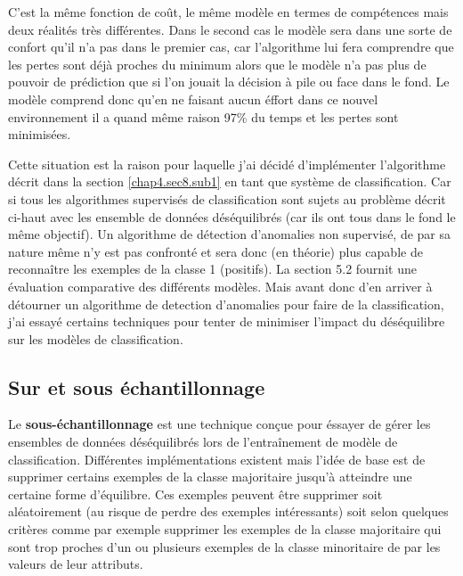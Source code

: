 C'est la même fonction de coût, le même modèle en termes de compétences mais deux réalités très différentes. Dans le second cas le modèle sera dans une sorte de confort qu'il n'a pas dans le premier cas, car l'algorithme lui fera comprendre que les pertes sont déjà proches du minimum alors que le modèle n'a pas plus de pouvoir de prédiction que si l'on jouait la décision à pile ou face dans le fond. Le modèle comprend donc qu'en ne faisant aucun éffort dans ce nouvel environnement il a quand même raison 97\% du temps et les pertes sont minimisées.

Cette situation est la raison pour laquelle j'ai décidé d'implémenter l'algorithme décrit dans la section \ref{chap4.sec8.sub1} en tant que système de classification. Car si tous les algorithmes supervisés de classification sont sujets au problème décrit ci-haut avec les ensemble de données déséquilibrés (car ils ont tous dans le fond le même objectif). Un algorithme de détection d'anomalies non supervisé, de par sa nature même n'y est pas confronté et sera donc (en théorie) plus capable de reconnaître les exemples de la classe 1 (positifs). La section 5.2 fournit une évaluation comparative des différents modèles. Mais avant donc d'en arriver à détourner un algorithme de detection d'anomalies pour faire de la classification, j'ai essayé certains techniques pour tenter de minimiser l'impact du déséquilibre sur les modèles de classification.

\subsection{Sur et sous échantillonnage}
\label{chap4.sec9.sub1}
Le \textbf{sous-échantillonnage} est une technique conçue pour éssayer de gérer les ensembles de données déséquilibrés lors de l'entraînement de modèle de classification. Différentes implémentations existent mais l'idée de base est de supprimer certains exemples de la classe majoritaire jusqu'à atteindre une certaine forme d'équilibre. Ces exemples peuvent être supprimer soit aléatoirement (au risque de perdre des exemples intéressants) soit selon quelques critères comme par exemple supprimer les exemples de la classe majoritaire qui sont trop proches d'un ou plusieurs exemples de la classe minoritaire de par les valeurs de leur attributs.

